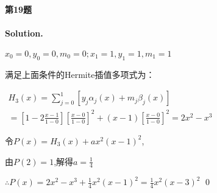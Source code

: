 \documentclass[a4paper]{article}
\newenvironment{solution}
{\color{blue} \paragraph{Solution.}}
{\newline \qed}
\begin{document}
	\paragraph{第19题}
\begin{solution}
$x_0=0,y_0=0,m_0=0;x_1=1,y_1=1,m_1=1$

满足上面条件的Hermite插值多项式为：

$\begin{array}{l}H_{3}(x)=\sum_{j=0}^{1}\left[y_j \alpha_{j}(x)+m_j \beta_{j}(x)\right] \\ =\left[1-2 \frac{x-1}{1-0}\right]\left[\frac{x-0}{1-0}\right]^{2}+(x-1)\left[\frac{x-0}{1-0}\right]^{2}=2 x^{2}-x^{3}\end{array}$

令$P(x)=H_{3}(x)+a x^{2}(x-1)^{2}$,

由$P(2)=1$,解得$a=\frac{1}{4}$

$\therefore P(x)=2 x^{2}-x^{3}+\frac{1}{4} x^{2}(x-1)^{2}=\frac{1}{4} x^{2}(x-3)^{2}$
\end{solution}
\end{document}
